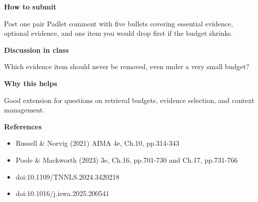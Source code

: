 \documentclass[11pt]{article}
\begin{document}
\begin{tcolorbox}[colback=white,colframe=MidnightBlue,title={Q4 Stretch Extension},fonttitle=\bfseries,breakable]
{\large\bfseries\color{MidnightBlue} How to submit}\par\medskip
Post one pair Padlet comment with five bullets covering essential evidence, optional evidence, and one item you would drop first if the budget shrinks.

{\large\bfseries\color{MidnightBlue} Discussion in class}\par\medskip
Which evidence item should never be removed, even under a very small budget?

{\large\bfseries\color{MidnightBlue} Why this helps}\par\medskip
Good extension for questions on retrieval budgets, evidence selection, and context management.

{\large\bfseries\color{MidnightBlue} References}\par\medskip
\begin{itemize}\item Russell \& Norvig (2021) AIMA 4e, Ch.10, pp.314-343
\item Poole \& Mackworth (2023) 3e, Ch.16, pp.701-730 and Ch.17, pp.731-766
\item doi:10.1109/TNNLS.2024.3420218
\item doi:10.1016/j.iswa.2025.200541\end{itemize}
\end{tcolorbox}
\end{document}
